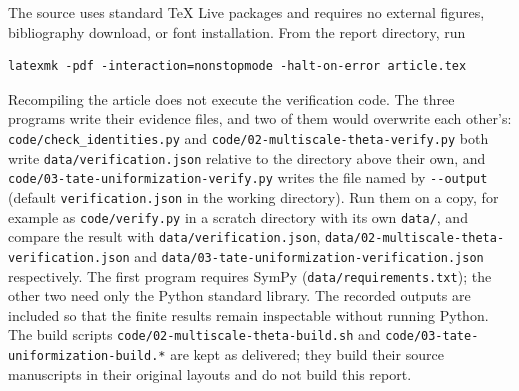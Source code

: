\documentclass[11pt,letterpaper]{article}
\theoremstyle{definition}
\newcommand{\file}[1]{\nolinkurl{#1}}
\begin{document}
The source uses standard TeX Live packages and requires no external
figures, bibliography download, or font installation. From the report
directory, run
\begin{verbatim}
latexmk -pdf -interaction=nonstopmode -halt-on-error article.tex
\end{verbatim}
Recompiling the article does not execute the verification code. The three
programs write their evidence files, and two of them would overwrite each
other's: \file{code/check_identities.py} and
\file{code/02-multiscale-theta-verify.py} both write
\file{data/verification.json} relative to the directory above their own,
and \file{code/03-tate-uniformization-verify.py} writes the file named by
\file{--output} (default \file{verification.json} in the working
directory). Run them on a copy, for example as \file{code/verify.py} in a
scratch directory with its own \file{data/}, and compare the result with
\file{data/verification.json}, \file{data/02-multiscale-theta-verification.json}
and \file{data/03-tate-uniformization-verification.json} respectively. The
first program requires SymPy (\file{data/requirements.txt}); the other two
need only the Python standard library. The recorded outputs are included so
that the finite results remain inspectable without running Python. The
build scripts \file{code/02-multiscale-theta-build.sh} and
\file{code/03-tate-uniformization-build.*} are kept as delivered; they build
their source manuscripts in their original layouts and do not build this
report.
\end{document}
